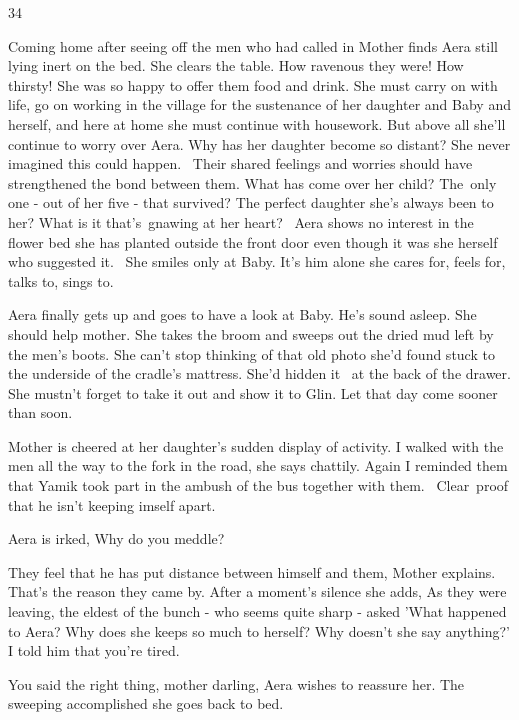 \documentclass[letterpaper]{article}
\begin{document}
\bigskip

34 

Coming home after seeing off the men who had called in Mother finds Aera still lying inert on the bed. She clears the
table. How ravenous they were! How thirsty! She was so happy to offer them food and drink. She must carry on with life,
go on working in the village for the sustenance of her daughter and Baby\textbf{ }and herself, and here at home she
must continue with housework.{ }But above all she'll continue to worry over Aera. Why has her daughter
become so distant? She never imagined this could happen. ~Their shared feelings and worries should have strengthened
the bond between them. What has come over her child? The~only one - out of her five - that survived? The perfect
daughter she's always been to her? What is it that's~gnawing at her heart? ~Aera shows no interest in the flower bed
she has planted outside the front door even though it was she herself who suggested it. ~She smiles only at Baby. It's
him alone she cares for, feels for, talks to, sings to.

Aera finally gets up and goes to have a look at Baby. He's sound asleep. She should help mother. She takes the broom and
sweeps out the dried mud left by the men's boots. She can't stop thinking of that old photo she'd found stuck
to{ }the underside of the cradle's mattress. She'd hidden it \ at the back of the drawer. She mustn't
forget to take it out and show it to Glin. Let that day come sooner than soon. 

Mother is cheered at her daughter's sudden display of activity. {\textquotedbl}I walked with the men all the way to the
fork in the road,{\textquotedbl} she says chattily. {\textquotedbl}Again I reminded them that Yamik took part in the
ambush of the bus together with them. \ Clear~proof that he isn't keeping imself apart.{\textquotedbl}

Aera is irked, {\textquotedbl}Why do you meddle?{\textquotedbl} 

{\textquotedbl}They feel that he has put distance between himself and them,{\textquotedbl} Mother explains.
{\textquotedbl}That's the reason they came by.{\textquotedbl} After a moment's silence she adds, {\textquotedbl}As they
were leaving, the eldest of the bunch - who seems quite sharp - asked 'What happened to Aera? Why does she keeps so
much to herself? Why doesn't she say anything?' I told him that you're tired.{\textquotedbl} 

{\textquotedbl}You said the right thing, mother darling,{\textquotedbl} Aera wishes to reassure her. The sweeping
accomplished she goes back to bed.
\end{document}
